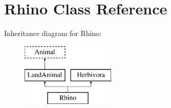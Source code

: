 \hypertarget{classRhino}{\section{Rhino Class Reference}
\label{classRhino}
}
Inheritance diagram for Rhino\-:\begin{figure}[H]
\begin{center}
\leavevmode
\includegraphics[height=3.000000cm]{classRhino}
\end{center}
\end{figure}
